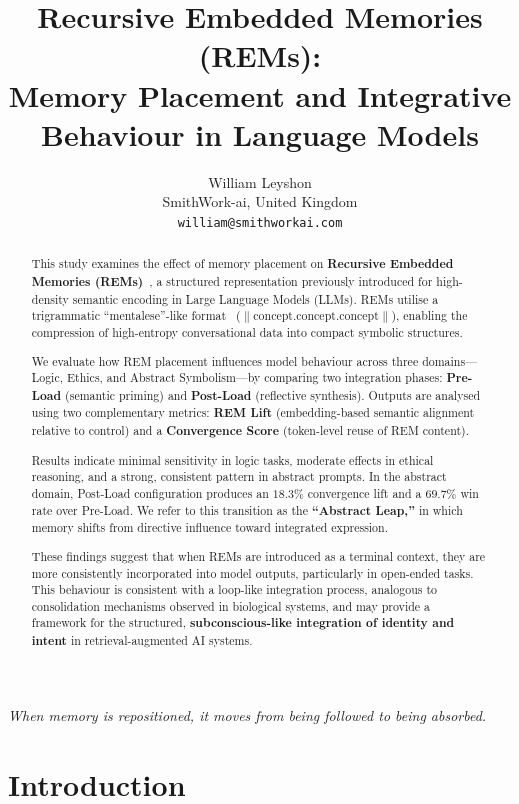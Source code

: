 \documentclass[11pt]{article}
\title{Recursive Embedded Memories (REMs):\\
Memory Placement and Integrative Behaviour in Language Models}
\author{
William Leyshon \\
SmithWork-ai, United Kingdom \\
\texttt{william@smithworkai.com}
}
\date{}
\begin{document}
\maketitle

\begin{center}
\textit{When memory is repositioned, it moves from being followed to being absorbed.}
\end{center}

\begin{abstract}

This study examines the effect of memory placement on \textbf{Recursive Embedded Memories (REMs)}~\cite{Ley2026}, a structured representation previously introduced for high-density semantic encoding in Large Language Models (LLMs). REMs utilise a trigrammatic ``mentalese''-like format~\cite{fodor1975} (\(\|\text{concept.concept.concept}\|\)), enabling the compression of high-entropy conversational data into compact symbolic structures.

We evaluate how REM placement influences model behaviour across three domains—Logic, Ethics, and Abstract Symbolism—by comparing two integration phases: \textbf{Pre-Load} (semantic priming) and \textbf{Post-Load} (reflective synthesis). Outputs are analysed using two complementary metrics: \textbf{REM Lift} (embedding-based semantic alignment relative to control) and a \textbf{Convergence Score} (token-level reuse of REM content).

Results indicate minimal sensitivity in logic tasks, moderate effects in ethical reasoning, and a strong, consistent pattern in abstract prompts. In the abstract domain, Post-Load configuration produces an \(18.3\%\) convergence lift and a \(69.7\%\) win rate over Pre-Load. We refer to this transition as the \textbf{``Abstract Leap,''} in which memory shifts from directive influence toward integrated expression.

These findings suggest that when REMs are introduced as a terminal context, they are more consistently incorporated into model outputs, particularly in open-ended tasks. This behaviour is consistent with a loop-like integration process, analogous to consolidation mechanisms observed in biological systems, and may provide a framework for the structured, \textbf{subconscious-like integration of identity and intent} in retrieval-augmented AI systems.

\end{abstract}


\section{Introduction}
\end{document}
